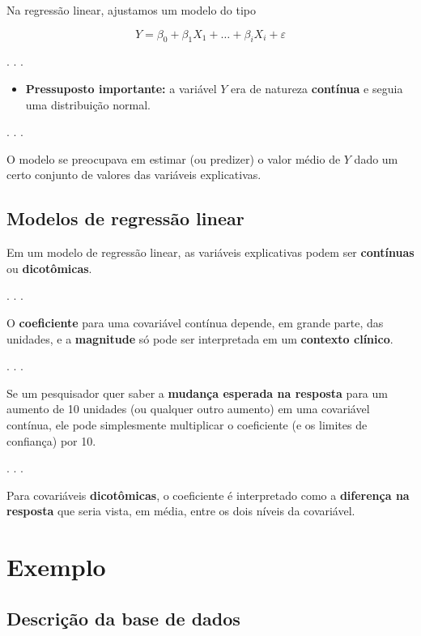 \documentclass[
  letterpaper,
  DIV=11,
  numbers=noendperiod]{scrartcl}
\providecommand{\tightlist}{%
  \setlength{\itemsep}{0pt}\setlength{\parskip}{0pt}}\usepackage{longtable,booktabs,array}
\begin{document}
Na regressão linear, ajustamos um modelo do tipo

\[Y = \beta_0 + \beta_1X_1+ \dots + \beta_iX_i + \varepsilon\]

. . .

\begin{itemize}
\tightlist
\item
  \textbf{Pressuposto importante:} a variável \(Y\) era de natureza
  \textbf{contínua} e seguia uma distribuição normal.
\end{itemize}

. . .

O modelo se preocupava em estimar (ou predizer) o valor médio de \(Y\)
dado um certo conjunto de valores das variáveis explicativas.

\subsection{Modelos de regressão
linear}\label{modelos-de-regressuxe3o-linear-1}

Em um modelo de regressão linear, as variáveis explicativas podem ser
\textbf{contínuas} ou \textbf{dicotômicas}.

. . .

O \textbf{coeficiente} para uma covariável contínua depende, em grande
parte, das unidades, e a \textbf{magnitude} só pode ser interpretada em
um \textbf{contexto clínico}.

. . .

Se um pesquisador quer saber a \textbf{mudança esperada na resposta}
para um aumento de 10 unidades (ou qualquer outro aumento) em uma
covariável contínua, ele pode simplesmente multiplicar o coeficiente (e
os limites de confiança) por 10.

. . .

Para covariáveis \textbf{dicotômicas}, o coeficiente é interpretado como
a \textbf{diferença na resposta} que seria vista, em média, entre os
dois níveis da covariável.

\section{Exemplo}\label{exemplo}

\subsection{Descrição da base de
dados}\label{descriuxe7uxe3o-da-base-de-dados}
\end{document}
